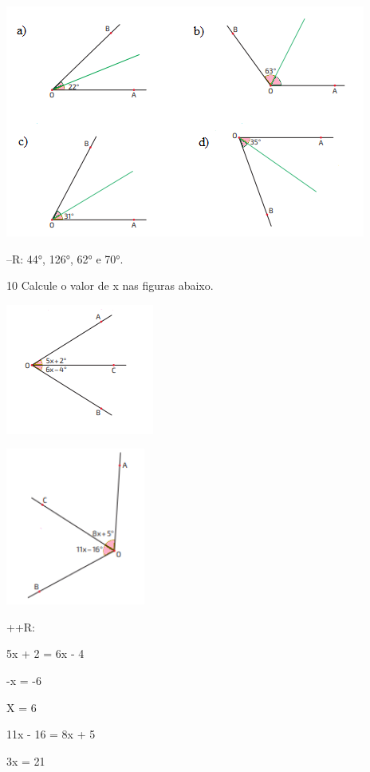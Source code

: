 {\includegraphics[width=4.66667in,height=3in]{./imgSAEB_8_MAT/media/image32.png}

--R: 44°, 126°, 62° e 70°.

\num{10} Calcule o valor de x nas figuras abaixo.
\item
\includegraphics[width=1.91667in,height=1.6875in]{./imgSAEB_8_MAT/media/image33.png}
\item
\includegraphics[width=1.80208in,height=2.02917in]{./imgSAEB_8_MAT/media/image34.png}

++R:
\item

5x + 2 = 6x - 4

-x = -6

X = 6
\item

11x - 16 = 8x + 5

3x = 21

}
